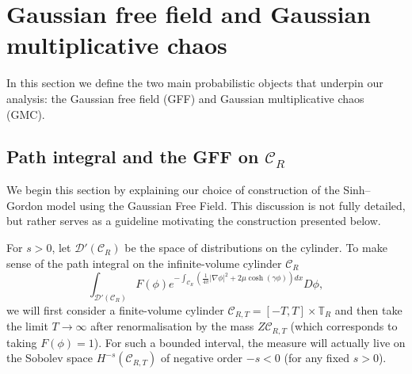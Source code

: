 \documentclass[11pt]{amsart}
\numberwithin{equation}{section}
\theoremstyle{definition}
\newcommand{\mc}{\mathcal}
\begin{document}
\section{Gaussian free field and Gaussian multiplicative chaos} \label{sec: GFF}


In this section we define the two main probabilistic objects that underpin our analysis: the Gaussian free field (GFF) and Gaussian multiplicative chaos (GMC). 



\subsection{Path integral and the GFF on $\mc{C}_R$}\label{s:Path_Integral}
We begin this section by explaining our choice of construction of the Sinh–Gordon model using the Gaussian Free Field.
This discussion is not fully detailed, but rather serves 
as a guideline motivating the construction presented below. 

For $s>0$, let $\mc{D}'(\mc{C}_R)$ be the space of distributions on the cylinder. 
To make sense of the path integral on the infinite-volume cylinder $\mc{C}_R$
\begin{equation}\label{path_integral_sinh}
\int_{\mc{D}'(\mathcal{C}_{R})} F(\phi) e^{- \int_{\mathcal{C}_{R}}( \frac 1{4\pi}|\nabla \phi|^2+2\mu\cosh(\gamma \phi))dx} D\phi,
\end{equation}
we will first consider a finite-volume cylinder $\mathcal{C}_{R,T} = [-T,T] \times \mathbb{T}_{R}$ and then take the limit $T\to \infty$ after renormalisation by the mass $Z{\mc{C}_{R,T}}$ (which corresponds to taking $F(\phi)=1$).
For such a bounded interval, the measure will actually live on the Sobolev space $H^{-s}(\mc{C}_{R,T})$ of negative order $-s<0$ (for any fixed $s>0$).
\end{document}
